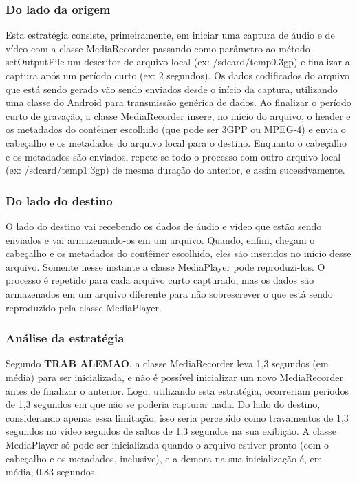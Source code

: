 \documentclass{acm_proc_article-sp}
\newcommand{\todo}[1]{\textcolor[rgb]{1.00,0.00,0.00}{\bf \uppercase{#1}}}
\begin{document}
\subsubsection{Do lado da origem}

Esta estratégia consiste, primeiramente, em iniciar uma captura de áudio e de vídeo com a classe MediaRecorder passando como parâmetro ao método setOutputFile um descritor de arquivo local (ex: /sdcard/temp0.3gp) e finalizar a captura após um período curto (ex: 2 segundos). Os dados codificados do arquivo que está sendo gerado vão sendo enviados desde o início da captura, utilizando uma classe do Android para transmissão genérica de dados. Ao finalizar o período curto de gravação, a classe MediaRecorder insere, no início do arquivo, o header e os metadados do contêiner escolhido (que pode ser 3GPP ou MPEG-4) e envia o cabeçalho e os metadados do arquivo local para o destino. Enquanto o cabeçalho e os metadados são enviados, repete-se todo o processo com outro arquivo local (ex: /sdcard/temp1.3gp) de mesma duração do anterior, e assim sucessivamente.

\subsubsection{Do lado do destino}

O lado do destino vai recebendo os dados de áudio e vídeo que estão sendo enviados e vai armazenando-os em um arquivo. Quando, enfim, chegam o cabeçalho e os metadados do contêiner escolhido, eles são inseridos no início desse arquivo. Somente nesse instante a classe MediaPlayer pode reproduzi-los. O processo é repetido para cada arquivo curto capturado, mas os dados são armazenados em um arquivo diferente para não sobrescrever o que está sendo reproduzido pela classe MediaPlayer.

\subsubsection{Análise da estratégia}

Segundo \todo{trab alemao}, a classe MediaRecorder leva 1,3 segundos (em média) para ser inicializada, e não é possível inicializar um novo MediaRecorder antes de finalizar o anterior. Logo, utilizando esta estratégia, ocorreriam períodos de 1,3 segundos em que não se poderia capturar nada. Do lado do destino, considerando apenas essa limitação, isso seria percebido como travamentos de 1,3 segundos no vídeo seguidos de saltos de 1,3 segundos na sua exibição. A classe MediaPlayer só pode ser inicializada quando o arquivo estiver pronto (com o cabeçalho e os metadados, inclusive), e a demora na sua inicialização é, em média, 0,83 segundos.
\end{document}
